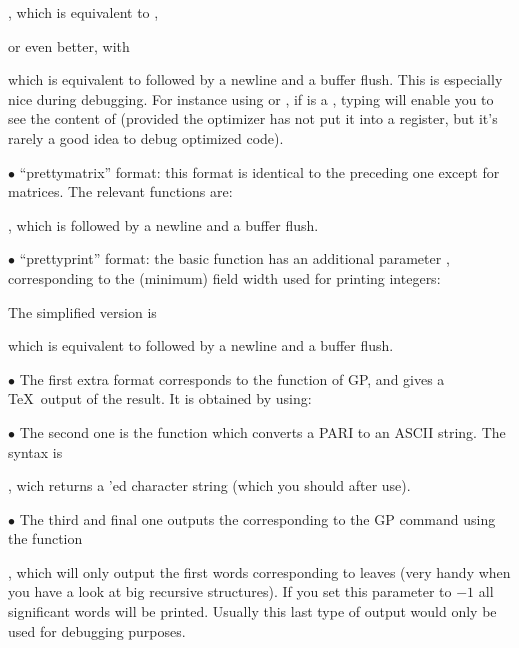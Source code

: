 , which is equivalent to ,

\noindent or even better, with

 which is equivalent to 
followed by a newline and a buffer flush. This is especially nice during
debugging. For instance using  or , if  is a
, typing  will enable you to see the
content of  (provided the optimizer has not put it into a
register, but it's rarely a good idea to debug optimized code).

\noindent $\bullet$ ``prettymatrix'' format: this format is identical to the
preceding one except for matrices. The relevant functions are:


, which is followed by a newline and a buffer flush.

\noindent $\bullet$ ``prettyprint'' format: the basic function has an
additional parameter , corresponding to the (minimum) field width
used for printing integers:


\noindent The simplified version is

 which is equivalent to
 followed by a newline and a buffer flush.

\noindent $\bullet$ The first extra format corresponds to the 
function of GP, and gives a \TeX\ output of the result. It is obtained by
using:


\noindent $\bullet$ The second one is the function  which
converts a PARI  to an ASCII string. The syntax is

, wich returns a 'ed character
string (which you should  after use).

\noindent $\bullet$ The third and final one outputs the 
corresponding to the GP command  using the function

, which will only output the first
 words corresponding to leaves (very handy when you have a look at
big recursive structures). If you set this parameter to $-1$ all
significant words will be printed. Usually this last type of output would
only be used for debugging purposes.

